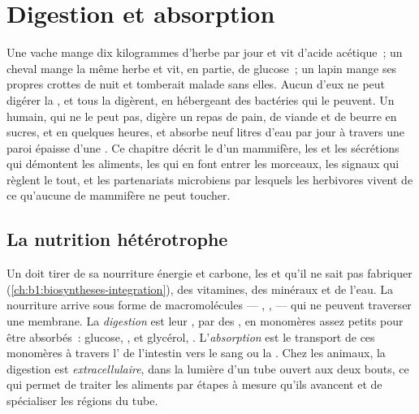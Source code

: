 \chapter{Digestion et absorption}\label{ch:b1:digestion-absorption}

Une vache mange dix kilogrammes d'herbe par jour et vit d'acide
acétique~; un cheval mange la même herbe et vit, en partie, de glucose~;
un lapin mange ses propres crottes de nuit et tomberait malade sans
elles. Aucun d'eux ne peut digérer la , et tous la digèrent,
en hébergeant des bactéries qui le peuvent. Un humain, qui ne le peut
pas, digère un repas de pain, de viande et de beurre en sucres,  et  en quelques heures, et absorbe neuf litres d'eau
par jour à travers une paroi épaisse d'une . Ce chapitre décrit
le  d'un mammifère, les  et les sécrétions qui
démontent les aliments, les  qui en font entrer les morceaux,
les signaux qui règlent le tout, et les partenariats microbiens par
lesquels les herbivores vivent de ce qu'aucune  de mammifère ne
peut toucher.

\section{La nutrition hétérotrophe}

\begin{definition}\label{def:b1:digestion-absorption:nutrition}
Un  doit tirer de sa nourriture énergie et carbone, les
 et  qu'il ne sait pas fabriquer
(\cref{ch:b1:biosyntheses-integration}), des vitamines, des minéraux et
de l'eau. La nourriture arrive sous forme de macromolécules --- ,
,  --- qui ne peuvent traverser une membrane. La
\emph{digestion} est leur , par des , en monomères
assez petits pour être absorbés~: glucose, , 
et glycérol, . L'\emph{absorption} est le transport de ces
monomères à travers l' de l'intestin vers le sang ou la
. Chez les animaux, la digestion est \emph{extracellulaire}, dans
la lumière d'un tube ouvert aux deux bouts, ce qui permet de traiter
les aliments par étapes à mesure qu'ils avancent et de spécialiser les
régions du tube.
\end{definition}

